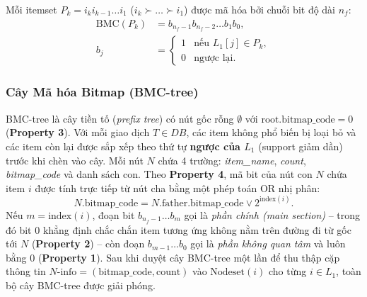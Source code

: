 \documentclass[conference]{IEEEtran}
\begin{document}
Mỗi itemset $P_k = i_k i_{k-1} \dots i_1$ ($i_k \succ \dots \succ i_1$) được mã hóa bởi chuỗi bit độ dài $n_f$:
\begin{align}
\text{BMC}(P_k) &= b_{n_f - 1} b_{n_f - 2} \dots b_1 b_0, \nonumber \\
b_j &=
\begin{cases}
1 & \text{nếu } L_1[j] \in P_k, \\
0 & \text{ngược lại.}
\end{cases}
\label{eq:bmc}
\end{align}

\subsubsection{Cây Mã hóa Bitmap (BMC-tree)}
BMC-tree là cây tiền tố (\textit{prefix tree}) có nút gốc rỗng $\emptyset$ với $\text{root.bitmap\_code} = 0$ (\textbf{Property 3}). Với mỗi giao dịch $T \in DB$, các item không phổ biến bị loại bỏ và các item còn lại được sắp xếp theo thứ tự \textbf{ngược của $L_1$} (support giảm dần) trước khi chèn vào cây. Mỗi nút $N$ chứa 4 trường: \textit{item\_name}, \textit{count}, \textit{bitmap\_code} và danh sách con. Theo \textbf{Property 4}, mã bit của nút con $N$ chứa item $i$ được tính trực tiếp từ nút cha bằng một phép toán OR nhị phân:
\begin{equation}
N.\text{bitmap\_code} = N.\text{father.bitmap\_code} \lor 2^{\text{index}(i)}.
\label{eq:prop4}
\end{equation}
Nếu $m = \text{index}(i)$, đoạn bit $b_{n_f - 1} \dots b_m$ gọi là \textit{phần chính (main section)} -- trong đó bit $0$ khẳng định chắc chắn item tương ứng không nằm trên đường đi từ gốc tới $N$ (\textbf{Property 2}) -- còn đoạn $b_{m-1} \dots b_0$ gọi là \textit{phần không quan tâm} và luôn bằng $0$ (\textbf{Property 1}). Sau khi duyệt cây BMC-tree một lần để thu thập cặp thông tin $N\text{-info} = (\text{bitmap\_code}, \text{count})$ vào $\text{Nodeset}(i)$ cho từng $i \in L_1$, toàn bộ cây BMC-tree được giải phóng.
\end{document}
